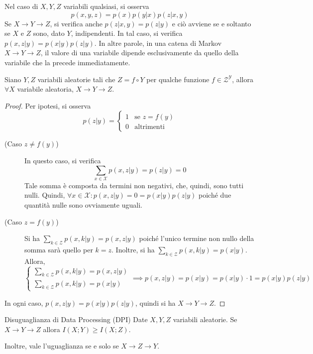 \begin{observation}{}
  Nel caso di $X,Y,Z$ variabili qualsiasi, si osserva
  \[p(x,y,z)=p(x)p(y|x)p(z|x,y)\]
  Se $X \to Y \to Z$, si verifica anche $p(z|x,y)=p(z|y)$ e ciò avviene se e soltanto se $X$ e $Z$ sono, dato $Y$, indipendenti. In tal caso, si verifica $p(x,z|y)=p(x|y)p(z|y)$.
  In altre parole, in una catena di Markov $X \to Y \to Z$, il valore di una variabile dipende esclusivamente da quello della variabile che la precede immediatamente.
\end{observation}

\begin{proposition}[label=prop:markov_chain_third_funcion_second]{}
  Siano \(Y,Z\) variabili aleatorie tali che \(Z = f \circ Y\) per qualche funzione \(f \in \mathcal{Z}^{\mathcal{Y}}\), allora \( \forall X\) variabile aleatoria, \(X \to Y \to Z\).
\end{proposition}
\begin{proof}
  Per ipotesi, si osserva
  \begin{equation*}
    p(z|y) = \begin{cases}
      1 & \text{se } z = f(y) \\
      0 & \text{altrimenti}
    \end{cases}
  \end{equation*}
  \begin{description}
    \item[(Caso $z \neq f(y)$)]
      In questo caso, si verifica \[\sum_{x\in\mathcal{X}}p(x,z|y)=p(z|y)=0\]
      Tale somma è composta da termini non negativi, che, quindi, sono tutti nulli. Quindi, $\forall x\in\mathcal{X}:p(x,z|y)=0=p(x|y)p(z|y)$ poiché due quantità nulle sono ovviamente uguali.
    \item[(Caso $z = f(y)$)]
      Si ha \(\sum_{k\in\mathcal{Z}}p(x,k|y)=p(x,z|y)\) poiché l'unico termine non nullo della somma sarà quello per $k=z$. 
      Inoltre, si ha \(\sum_{k\in\mathcal{Z}}p(x,k|y)=p(x|y)\). Allora, 
      \[\begin{cases}
        \sum_{k\in\mathcal{Z}}p(x,k|y)=p(x,z|y) \\
        \sum_{k\in\mathcal{Z}}p(x,k|y)=p(x|y)
      \end{cases} \implies p(x,z|y)=p(x|y)=p(x|y)\cdot 1=p(x|y)p(z|y)\]
  \end{description}
  In ogni caso, \(p(x,z|y)=p(x|y)p(z|y)\), quindi si ha $X \to Y \to Z$. 
\end{proof}

\begin{proposition}[label=prop:dpi]{Disuguaglianza di Data Processing (DPI)}
  Date \(X,Y,Z\) variabili aleatorie.
  Se \(X \to Y \to Z\) allora \(I(X;Y) \geq I(X;Z)\).

  Inoltre, vale l'uguaglianza se e solo se \(X \to Z \to Y\).
\end{proposition}

